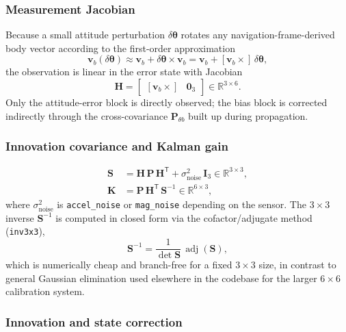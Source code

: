 \documentclass[11pt]{article}
\newcommand{\vect}[1]{\bm{#1}}
\newcommand{\mat}[1]{\bm{#1}}
\newcommand{\R}{\mathbb{R}}
\newcommand{\transpose}{^{\mathsf{T}}}
\newcommand{\skewm}[1]{\left[#1\times\right]}
\begin{document}
\subsubsection{Measurement Jacobian}

Because a small attitude perturbation $\delta\vect\theta$ rotates any navigation-frame-derived body vector according to the first-order approximation
\begin{equation}
\vect v_b(\delta\vect\theta) \approx \vect v_b + \delta\vect\theta \times \vect v_b = \vect v_b + \skewm{\vect v_b}\,\delta\vect\theta,
\end{equation}
the observation is linear in the error state with Jacobian
\begin{equation}
\mat H = \begin{bmatrix} \skewm{\vect v_b} & \mat 0_3 \end{bmatrix} \in \R^{3\times6}.
\label{eq:H}
\end{equation}
Only the attitude-error block is directly observed; the bias block is corrected indirectly through the cross-covariance $\mat P_{\theta b}$ built up during propagation.

\subsubsection{Innovation covariance and Kalman gain}

\begin{align}
\mat S &= \mat H\, \mat P\, \mat H\transpose + \sigma_{\text{noise}}^2\, \mat I_3 \in \R^{3\times3}, \label{eq:S}\\
\mat K &= \mat P\, \mat H\transpose\, \mat S^{-1} \in \R^{6\times3}, \label{eq:K}
\end{align}
where $\sigma_{\text{noise}}^2$ is \texttt{accel\_noise} or \texttt{mag\_noise} depending on the sensor. The $3\times3$ inverse $\mat S^{-1}$ is computed in closed form via the cofactor/adjugate method (\texttt{inv3x3}),
\begin{equation}
\mat S^{-1} = \frac{1}{\det\mat S}\,\operatorname{adj}(\mat S),
\end{equation}
which is numerically cheap and branch-free for a fixed $3\times3$ size, in contrast to general Gaussian elimination used elsewhere in the codebase for the larger $6\times6$ calibration system.

\subsubsection{Innovation and state correction}
\end{document}
